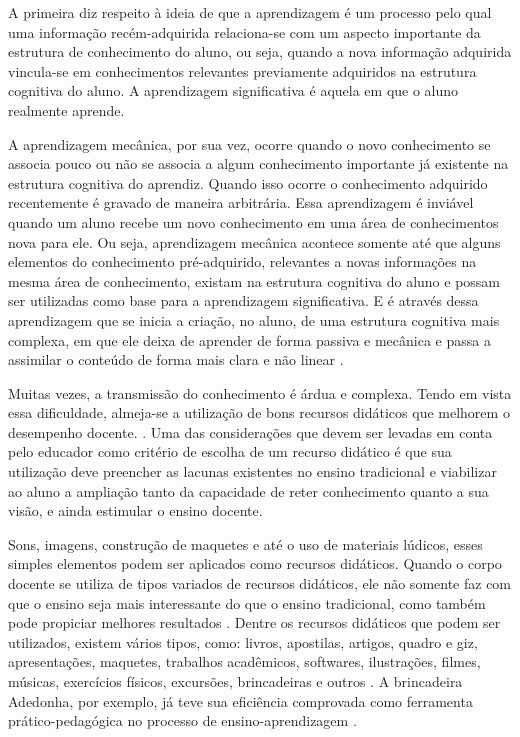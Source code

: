 A primeira diz respeito à ideia de que a aprendizagem é um processo pelo qual uma informação recém-adquirida relaciona-se com um aspecto importante da estrutura de conhecimento do aluno, ou seja, quando a nova informação adquirida vincula-se em conhecimentos relevantes previamente adquiridos na estrutura cognitiva do aluno. A aprendizagem significativa é aquela em que o aluno realmente aprende.

A aprendizagem mecânica, por sua vez, ocorre quando o novo conhecimento se associa pouco ou não se associa a algum conhecimento importante já existente na estrutura cognitiva do aprendiz. Quando isso ocorre o conhecimento adquirido recentemente é gravado de maneira arbitrária. Essa aprendizagem é inviável quando um aluno recebe um novo conhecimento em uma área de conhecimentos nova para ele. Ou seja, aprendizagem mecânica acontece somente até que alguns elementos do conhecimento pré-adquirido, relevantes a novas informações na mesma área de conhecimento, existam na estrutura cognitiva do aluno e possam ser utilizadas como base para a aprendizagem significativa. E é através dessa aprendizagem que se inicia a criação, no aluno, de uma estrutura cognitiva mais complexa, em que ele deixa de aprender de forma passiva e mecânica e passa a assimilar o conteúdo de forma mais clara e não linear \cite{ausubel80}.

Muitas vezes, a transmissão do conhecimento é árdua e complexa. Tendo em vista essa dificuldade, almeja-se a utilização de bons recursos didáticos que melhorem o desempenho docente. \cite{souza07}. Uma das considerações que devem ser levadas em conta pelo educador como critério de escolha de um recurso didático é que sua utilização deve preencher as lacunas existentes no ensino tradicional e viabilizar ao aluno a ampliação 
tanto da capacidade de reter conhecimento quanto a sua visão, e ainda estimular o ensino docente. \cite{trivelato06}

Sons, imagens, construção de maquetes e até o uso de materiais lúdicos, esses simples elementos podem ser aplicados como recursos didáticos. Quando o corpo docente se utiliza de tipos variados de recursos didáticos, ele não somente faz com que o ensino seja mais interessante do que o ensino tradicional, como também pode propiciar melhores resultados \cite{parra85} \cite{souza07} \cite{costoldi09}. Dentre os recursos didáticos que podem ser utilizados, existem vários tipos, como: livros, apostilas, artigos, quadro e giz, apresentações, maquetes, trabalhos acadêmicos, softwares, ilustrações, filmes, músicas, exercícios físicos, excursões, brincadeiras e outros \cite{ferreira07}. A brincadeira Adedonha, por exemplo, já teve sua eficiência comprovada como ferramenta prático-pedagógica no processo de ensino-aprendizagem \cite{silva18}.

